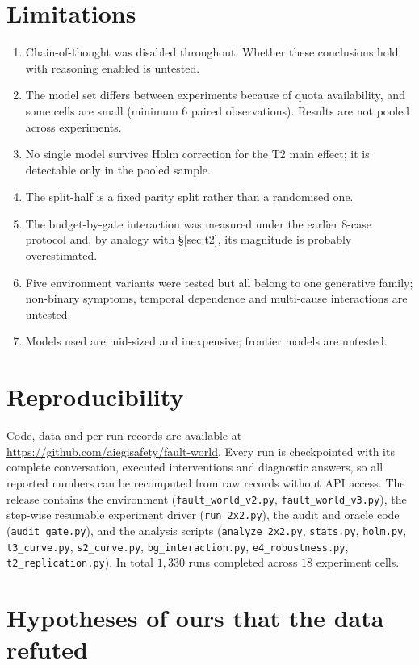 \documentclass[11pt]{article}
\begin{document}
\section{Limitations}\label{sec:limitations}
\begin{enumerate}\itemsep2pt
\item Chain-of-thought was disabled throughout. Whether these conclusions hold with reasoning
enabled is untested.
\item The model set differs between experiments because of quota availability, and some cells
are small (minimum $6$ paired observations). Results are not pooled across experiments.
\item No single model survives Holm correction for the T2 main effect; it is detectable only
in the pooled sample.
\item The split-half is a fixed parity split rather than a randomised one.
\item The budget-by-gate interaction was measured under the earlier $8$-case protocol and,
by analogy with \S\ref{sec:t2}, its magnitude is probably overestimated.
\item Five environment variants were tested but all belong to one generative family; non-binary
symptoms, temporal dependence and multi-cause interactions are untested.
\item Models used are mid-sized and inexpensive; frontier models are untested.
\end{enumerate}

\section{Reproducibility}
Code, data and per-run records are available at
\url{https://github.com/aiegisafety/fault-world}.
Every run is checkpointed with its complete conversation, executed interventions and
diagnostic answers, so all reported numbers can be recomputed from raw records without
API access. The release contains the environment (\texttt{fault\_world\_v2.py},
\texttt{fault\_world\_v3.py}), the step-wise resumable experiment driver
(\texttt{run\_2x2.py}), the audit and oracle code (\texttt{audit\_gate.py}), and the analysis
scripts (\texttt{analyze\_2x2.py}, \texttt{stats.py}, \texttt{holm.py}, \texttt{t3\_curve.py},
\texttt{s2\_curve.py}, \texttt{bg\_interaction.py}, \texttt{e4\_robustness.py},
\texttt{t2\_replication.py}). In total $1{,}330$ runs completed across $18$ experiment cells.

\appendix
\section{Hypotheses of ours that the data refuted}\label{app:refuted}
\end{document}
